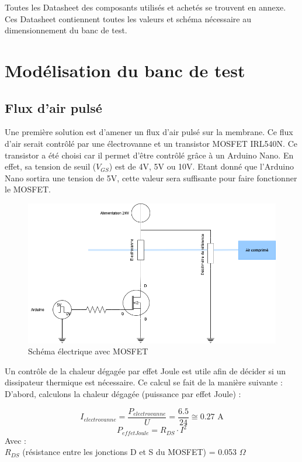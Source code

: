 Toutes les Datasheet des composants utilisés et achetés se trouvent en annexe. Ces Datasheet contiennent toutes les valeurs et schéma nécessaire
au dimensionnement du banc de test.

\section{Modélisation du banc de test}
\subsection{Flux d'air pulsé}
Une première solution est d'amener un flux d'air pulsé sur la membrane. Ce flux d'air serait contrôlé par une électrovanne et un
transistor MOSFET IRL540N. Ce transistor a été choisi car il permet d'être contrôlé grâce à un Arduino Nano. En effet, sa tension de seuil
($V_{GS}$) est de 4V, 5V ou 10V. Etant donné que l'Arduino Nano sortira une tension de 5V, cette valeur sera suffisante pour faire fonctionner
le MOSFET.
\begin{figure}[H]
    \centering
    \includegraphics[scale=0.6]{assets/figures/MOSFET.png}
    \caption{Schéma électrique avec MOSFET}
    \label{fig:MOSFET}
\end{figure}
Un contrôle de la chaleur dégagée par effet Joule est utile afin de décider si un dissipateur thermique est nécessaire. Ce calcul se fait
de la manière suivante :\\
D'abord, calculons la chaleur dégagée (puissance par effet Joule) :

\[I_{electrovanne} = \frac{P_{electrovanne}}{U} = \frac{6.5}{24} \cong 0.27 \text{ A} \]
\[P_{effetJoule} = R_{DS}\cdot I^2\]
Avec :\\
$R_{DS}$ (résistance entre les jonctions D et S du MOSFET) = 0.053 $\Omega$

